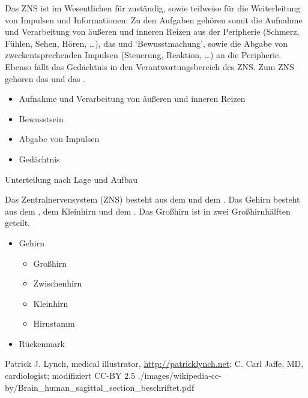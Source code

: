 \TextSlide
{\TxBeschreibung}
{%

Das ZNS ist im Wesentlichen für 
 zuständig, 
sowie teilweise für die Weiterleitung von Impulsen und Informationen:
%
Zu den Aufgaben gehören somit
die Aufnahme  und Verarbeitung von äußeren und inneren Reizen aus der Peripherie
(Schmerz, Fühlen, Sehen, Hören, {\dots}), 
das  
und \enquote*{Bewusstmachung}, 
sowie die  Abgabe  von zweckentsprechenden Impulsen
(Steuerung, Reaktion, {\dots}) 
an die Peripherie. 
%
Ebenso fällt das Gedächtnis in den Verantwortungsbereich des ZNS. 
%
Zum ZNS gehören das  und das .

}
{\begin{itemize}
    \item Aufnahme  und Verarbeitung  von äußeren und
    inneren  Reizen
    \item Bewusstsein 
    \item Abgabe  von Impulsen
    \item Gedächtnis
\end{itemize}}




\TextSlide
{Unterteilung nach Lage und Aufbau}%
{%
Das Zentralnervensystem (ZNS) besteht aus dem 
und dem . 
Das Gehirn besteht aus dem
,  dem Kleinhirn und dem
. Das Großhirn ist in zwei Großhirnhälften
geteilt.

\bigskip

\bigskip

\bigskip

\bigskip

\bigskip}%
{
\begin{itemize}
    \item Gehirn
    \begin{itemize}
        \item Großhirn
        \item Zwischenhirn
        \item {Kleinhirn}
        \item Hirnstamm
    \end{itemize}
    \item Rückenmark
\end{itemize}}%


{}%
{}%
{Patrick J. Lynch, medical illustrator,
\url{http://patricklynch.net}; C. Carl Jaffe, MD,
cardiologist; modifiziert}%
{CC-BY 2.5}%
{./images/wikipedia-cc-by/Brain_human_sagittal_section_beschriftet.pdf}%
{}%


